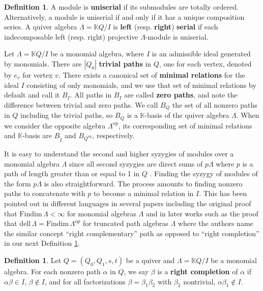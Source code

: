 \documentclass{conm-p-l}
\newcommand{\Findim}{\mathrm{Findim}\,}
\newcommand{\dell}{\mathrm{dell}\,}
\renewcommand{\dell}{\mathrm{dell}\,}
\newcommand{\op}{\mathrm{op}}
\renewcommand{\k}{\mathbb{K}}
\theoremstyle{definition}
\newtheorem{definition}[theorem]{Definition}
\theoremstyle{remark}
\numberwithin{equation}{section}
\begin{document}
\begin{definition}
\label{def:serial path algebra}
A module is \textbf{uniserial} if its submodules are totally ordered. Alternatively, a module is uniserial if and only if it has a unique composition series. A quiver algebra $\Lambda=\k Q/I$ is \textbf{left} (resp. \textbf{right}) \textbf{serial} if each indecomposable left (resp. right) projective $\Lambda$-module is uniserial.
\end{definition}

Let $\Lambda = \k Q/I$ be a monomial algebra, where $I$ is an admissible ideal generated by monomials. There are $|Q_0|$ \textbf{trivial paths} in $Q$, one for each vertex, denoted by $e_v$ for vertex $v$. There exists a canonical set of \textbf{minimal relations} for the ideal $I$ consisting of only monomials, and we use that set of minimal relations by default and call it $B_I$. All paths in $B_I$ are called \textbf{zero paths}, and note the difference between trivial and zero paths. We call $B_Q$ the set of all nonzero paths in $Q$ including the trivial paths, so $B_Q$ is a $\k$-basis of the quiver algebra $\Lambda$. When we consider the opposite algebra $\Lambda^{\op}$, its corresponding set of minimal relations and $\k$-basis are $B_{\tilde{I}}$ and $B_{Q^{\op}}$, respectively.

It is easy to understand the second and higher syzygies of modules over a monomial algebra $\Lambda$ since all second syzygies are direct sums of $p\Lambda$ where $p$ is a path of length greater than or equal to 1 in $Q$ \cite{huisgen1991predicting}. Finding the syzygy of modules of the form $p\Lambda$ is also straightforward. The process amounts to finding nonzero paths to concatenate with $p$ to become a minimal relation in $I$. This has been pointed out in different languages in several papers including the original proof that $\Findim\Lambda<\infty$ for monomial algebras $\Lambda$ \cite{GKK1991} and in later works such as the proof that $\dell\Lambda=\Findim\Lambda^{\op}$ for truncated path algebras $\Lambda$ where the authors name the similar concept ``right complementary'' path \cite{barrios2024delooping} as opposed to ``right completion'' in our next Definition \ref{def:right completion}.

\begin{definition}
\label{def:right completion}
Let $Q=(Q_0, Q_1, s, t)$ be a quiver and $\Lambda=\k Q/I$ be a monomial algebra. For each nonzero path $\alpha$ in $Q$, we say $\beta$ is a \textbf{right completion} of $\alpha$ if $\alpha\beta\in I$, $\beta\notin I$, and for all factorizations $\beta=\beta_1\beta_2$ with $\beta_2$ nontrivial, $\alpha\beta_1\notin I$.
\end{definition}
\end{document}
